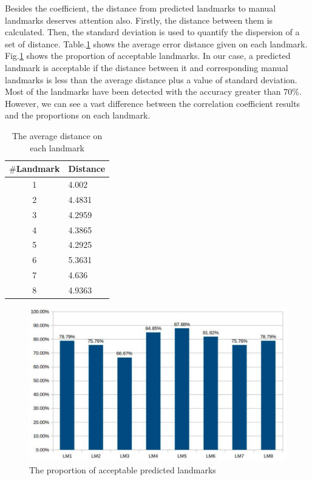 \documentclass[conference]{IEEEtran}
\begin{document}
Besides the coefficient, the distance from predicted landmarks to manual landmarks deserves attention also. Firstly, the distance between them is calculated. Then, the standard deviation\cite{bland1996statistics} is used to quantify the dispersion of a set of distance. Table.\ref{tab2} shows the average error distance given on each landmark. Fig.\ref{figchart} shows the proportion of acceptable landmarks. In our case, a predicted landmark is acceptable if the distance between it and corresponding manual landmarks is less than the average distance plus a value of standard deviation. Most of the landmarks have been detected with the accuracy greater than $70\%$. However, we can see a vast difference between the correlation coefficient results and the proportions on each landmark.

\begin{table}[htbp]
\caption{The average distance on each landmark}
\begin{center}
\begin{tabular}{|c|p{1.5cm}|}
\hline
\textbf{$\#$Landmark} & \textbf{Distance} \\ \hline
1 & 4.002  \\ \hline
2 & 4.4831 \\ \hline
3 & 4.2959 \\ \hline
4 & 4.3865 \\ \hline
5 & 4.2925 \\ \hline
6 & 5.3631 \\ \hline
7 & 4.636 \\ \hline
8 & 4.9363 \\ \hline
\end{tabular}
\label{tab2}
\end{center}
\end{table}

\begin{figure}[htbp]
	\centerline{\includegraphics[scale=0.2]{images/chart}}
	\caption{The proportion of acceptable predicted landmarks}
	\label{figchart}
\end{figure}
\end{document}
